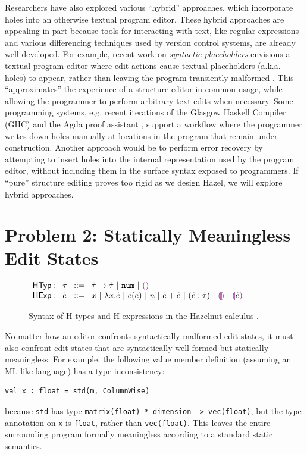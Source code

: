 \documentclass[letterpaper,USenglish]{lipics-v2016}
\let\li\lstinline
\newcommand{\Hazel}[0]{\textsf{Hazel}}
\begin{document}
Researchers have also explored various ``hybrid'' approaches, which incorporate holes into an otherwise textual program editor. These hybrid approaches are appealing in part because tools for interacting with text, like regular expressions and various differencing techniques used by version control systems, are already well-developed. For example, recent work on \emph{syntactic placeholders} envisions 
a textual program editor where edit actions cause textual placeholders (a.k.a. holes) to appear, rather than leaving the program transiently malformed \cite{Amorim:2016:PSC:2997364.2997374}. This 
``approximates'' the experience of a structure editor in common usage, while allowing the programmer to perform arbitrary 
text edits when necessary. Some programming systems, e.g. recent iterations of the Glasgow Haskell Compiler (GHC) \cite{GCHWIKI} and the Agda proof assistant \cite{norell2009dependently}, support a workflow where the programmer writes down holes manually at locations in the program that remain under construction. Another approach would be to perform error recovery by attempting to insert holes into the internal representation used 
by the program editor, without including them in the surface syntax exposed to programmers.  If ``pure'' structure editing proves too rigid as we design \Hazel, we will explore hybrid approaches.

\section{Problem 2: Statically Meaningless Edit States} \label{sec:p-statics}

\begin{figure}[t]
$\arraycolsep=4pt\begin{array}{lllllll}
\mathsf{HTyp:} & \htau & ::= &
  \tarr{\htau}{\htau} ~\vert~
  \tnum ~\vert~
  \tehole
\\
\mathsf{HExp:} & \hexp & ::= &
  x ~\vert~
  \hlam{x}{\hexp} ~\vert~
  \hap{\hexp}{\hexp} ~\vert~
  \hnum{n} ~\vert~
  \hadd{\hexp}{\hexp} ~\vert~
  (\hexp : \htau) ~\vert~
  \hehole ~\vert~
  \hhole{\hexp}
\end{array}$
\caption{Syntax of H-types and H-expressions in the Hazelnut calculus \cite{popl-paper}.}
\label{fig:hexp-syntax}
\end{figure}

No matter how an 
editor confronts syntactically malformed edit states, it must also confront 
edit states that are syntactically well-formed but statically meaningless. For
example, the following value member definition (assuming an ML-like language) has a type inconsistency:
\begin{lstlisting}[numbers=none]
val x : float = std(m, ColumnWise)
\end{lstlisting}
because \li{std} has type \li{matrix(float) * dimension -> vec(float)},
but the type annotation on \li{x} is \li{float}, rather than \li{vec(float)}. This leaves the entire surrounding program
formally meaningless according to a standard static semantics.
\end{document}
